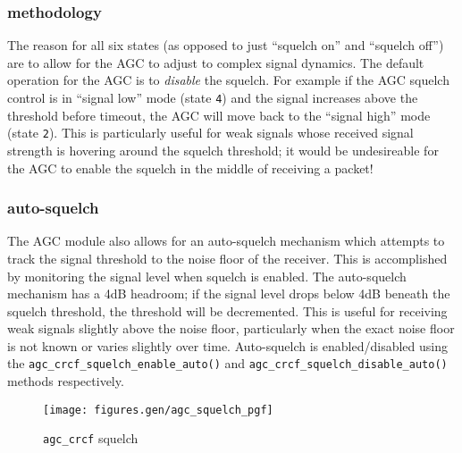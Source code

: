 \subsubsection{methodology}
The reason for all six states (as opposed to just ``squelch on'' and ``squelch
off'') are to allow for the AGC to adjust to complex signal dynamics.
The default operation for the AGC is to {\it disable} the squelch.
For example if the AGC squelch control is in ``signal low'' mode
(state {\tt 4}) and the signal increases above the threshold before timeout,
the AGC will move back to the ``signal high'' mode (state {\tt 2}).
This is particularly useful for weak signals whose received signal strength is
hovering around the squelch threshold; it would be undesireable for the AGC to
enable the squelch in the middle of receiving a packet!

\subsubsection{auto-squelch}
The AGC module also allows for an auto-squelch mechanism which attempts to
track the signal threshold to the noise floor of the receiver.
This is accomplished by monitoring the signal level when squelch is enabled.
The auto-squelch mechanism has a 4dB headroom; if the signal level drops below
4dB beneath the squelch threshold, the threshold will be decremented.
This is useful for receiving weak signals slightly above the noise floor,
particularly when the exact noise floor is not known or varies slightly over
time.
Auto-squelch is enabled/disabled using the
{\tt agc\_crcf\_squelch\_enable\_auto()} and 
{\tt agc\_crcf\_squelch\_disable\_auto()} methods respectively.

\begin{figure}
\centering
  \texttt{[image: figures.gen/agc\_squelch\_pgf]}
\caption{{\tt agc\_crcf} squelch}
\label{fig:module:agc:squelch}
\end{figure}



